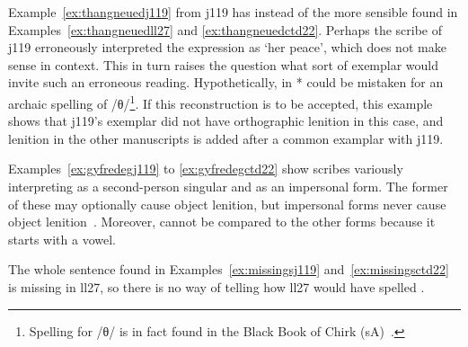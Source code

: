 \begin{mwl}
\end{mwl}
Example~\ref{ex:thangneuedj119} from \gls{j119} has  instead of the more sensible  found in Examples~\ref{ex:thangneuedll27} and \ref{ex:thangneuedctd22}. Perhaps the scribe of \gls{j119} erroneously interpreted the expression as `her peace', which does not make sense in context. This in turn raises the question what sort of exemplar would invite such an erroneous reading. Hypothetically,  in * could be mistaken for an archaic spelling of /θ/\footnote{Spelling  for /θ/ is in fact found in the Black Book of Chirk (\gls{sA})~\autocite[147]{Rus_Scribal95}.}. If this reconstruction is to be accepted, this example shows that \gls{j119}'s exemplar did not have orthographic lenition in this case, and lenition in the other manuscripts is added after a common examplar with \gls{j119}.
\begin{mwl}
\end{mwl}
Examples~\ref{ex:gyfredegj119} to \ref{ex:gyfredegctd22} show scribes variously interpreting  as a second-person singular and as an impersonal form. The former of these may optionally cause object lenition, but impersonal forms never cause object lenition~\autocite[67]{van_development14}. Moreover,  cannot be compared to the other forms because it starts with a vowel.

\begin{mwl}
\end{mwl}
The whole sentence found in Examples~\ref{ex:missingsj119} and~\ref{ex:missingsctd22} is missing in \gls{ll27}, so there is no way of telling how \gls{ll27} would have spelled .

